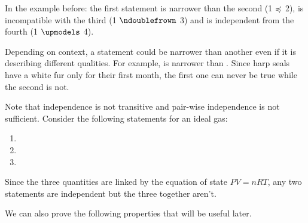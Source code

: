 \documentclass[11pt,letterpaper,fleqn]{memoir} %
\begin{document}
In the example before: the first statement is narrower than the second (1 $\preccurlyeq$ 2), is incompatible with the third (1 $\ncomp$ 3) and is independent from the fourth (1 $\indep$ 4).

Depending on context, a statement could be narrower than another even if it is describing different qualities. For example,  is narrower than . Since harp seals have a white fur only for their first month, the first one can never be true while the second is not.

Note that independence is not transitive and pair-wise independence is not sufficient. Consider the following statements for an ideal gas:
\begin{enumerate}
	\item {}
	\item {}
	\item {}
\end{enumerate}
Since the three quantities are linked by the equation of state $PV=nRT$, any two statements are independent but the three together aren't.

We can also prove the following properties that will be useful later.
\end{document}
